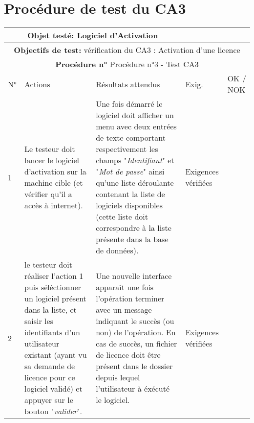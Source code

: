\section{Procédure de test du CA3}
\begin{table}[!h]
        \centering
        \begin{tabular}{|m{0.6cm}|
                         >{\raggedright\arraybackslash}m{4cm}|
                         >{\raggedright\arraybackslash}m{6.4cm}|
                         >{\raggedright\arraybackslash}m{2cm}|
                         m{1cm}|}
            \hline
            \multicolumn{3}{|c|}{
                \textbf{Objet testé: } Logiciel d'Activation 
            } & \multicolumn{2}{|c|}{
                \textbf{Version: } version    
            } \\
            \hline
            \multicolumn{5}{|c|}{\textbf{Objectifs de test:} 
                vérification du CA3 : Activation d'une licence} \\
            \hline
            \multicolumn{5}{|c|}{
                \textbf{Procédure n° }Procédure n°3 - Test CA3
            } \\
            \hline
            N° & Actions & Résultats attendus & Exig. & OK / NOK \\
            \hline      %
            1 & Le testeur doit lancer le logiciel d'activation sur la
                machine cible (et vérifier qu'il a accès à internet). 
              & Une fois démarré le logiciel doit afficher un menu avec 
                deux entrées de texte comportant respectivement les champs
                "\emph{Identifiant}" et "\emph{Mot de passe}" ainsi qu'une liste
                déroulante contenant la liste de logiciels disponibles
                (cette liste doit correspondre à la liste présente dans
                 la base de données).
              & Exigences vérifiées & \\
            \hline
            2 & le testeur doit réaliser l'action 1 puis séléctionner 
                un logiciel présent dans la liste, et saisir les 
                identifiants d'un utilisateur existant (ayant vu sa demande 
                de licence pour ce logiciel validé) et appuyer sur le bouton
                "\emph{valider}".  
              & Une nouvelle interface apparaît une fois l'opération terminer
                avec un message indiquant le succès (ou non) de l'opération.
                En cas de succès, un fichier de licence doit être présent 
                dans le dossier depuis lequel l'utilisateur à éxécuté le logiciel. 
              & Exigences vérifiées & \\
            \hline
        \end{tabular} 
        \label{tab:tab3}
\end{table}
\newpage

